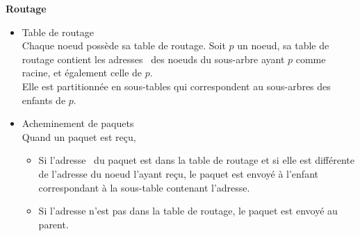         \textbf{Routage}\newline
        \begin{itemize}
            \item Table de routage\\
                Chaque noeud possède sa table de routage. Soit $p$ un noeud, sa table de routage contient les adresses \mac\ 
                des noeuds du sous-arbre ayant $p$ comme racine, et également celle de $p$.\\
                Elle est partitionnée en sous-tables qui correspondent au sous-arbres des enfants de $p$.
            \item Acheminement de paquets\\
                Quand un paquet est reçu,
                \begin{itemize}
                    \item Si l'adresse \mac\ du paquet est dans la table de routage et si elle est différente de l'adresse du noeud l'ayant reçu, le paquet est envoyé
                    à l'enfant correspondant à la sous-table contenant l'adresse.
                    \item Si l'adresse n'est pas dans la table de routage, le paquet est envoyé au parent.
                \end{itemize}

        \end{itemize}
        \vspace{0.5cm}

